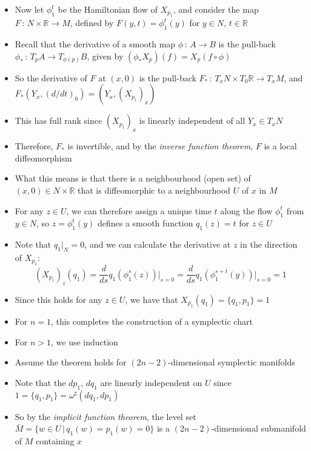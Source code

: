 \documentclass[12pt,a4paper]{article}
\numberwithin{equation}{section}
\begin{document}
\begin{itemize}
\begin{itemize}
			\item Now let $\phi_{1}^{t}$ be the Hamiltonian flow of $X_{p_{1}}$, and consider the map $F\,:\, N\times \mathbb{R}\to M$, defined by $F(y,t)=\phi_{1}^{t}(y)$ for $y\in N, \, t\in \mathbb{R}$
			\item Recall that the derivative of a smooth map $\phi\,:\, A \to B$ is the pull-back $\phi_{*}\,:\,T_{p}A\to T_{\phi(p)}B$, given by $(\phi_{*}X_{p})(f)=X_{p}(f\circ \phi)$
			\item So the derivative of $F$ at $(x,0)$ is the pull-back $F_{*}\,:\, T_{x}N\times T_{0}\mathbb{R}\to T_{x}M$, and $F_{*}(Y_{x},(d/dt)_{0})=(Y_{x},(X_{p_{1}})_{x})$
			\item This has full rank since $(X_{p_{1}})_{x}$ is linearly independent of all $Y_{x}\in T_{x}N$
			\item Therefore, $F_{*}$ is invertible, and by the \textit{inverse function theorem}, $F$ is a local diffeomorphism
			\item What this means is that there is a neighbourhood (open set) of $(x,0)\in N\times \mathbb{R}$ that is diffeomorphic to a neighbourhood $U$ of $x$ in $M$
			\item For any $z\in U$, we can therefore assign a unique time $t$ along the flow $\phi_{1}^{t}$ from $y\in N$, so $z=\phi_{1}^{t}(y)$ defines a smooth function $q_{1}(z)=t$ for $z\in U$
			\item Note that $q_{1}\rvert_{N}=0$, and we can calculate the derivative at $z$ in the direction of $X_{p_{1}}$:
			\begin{equation}
				(X_{p_{1}})_{z}(q_{1})=\frac{d}{ds}q_{1}(\phi_{1}^{s}(z))\rvert_{s=0}=\frac{d}{ds}q_{1}(\phi_{1}^{s+t}(y))\rvert_{s=0}=1
			\end{equation}
			\item Since this holds for any $z\in U$, we have that $X_{p_{1}}(q_{1})=\{q_{1},p_{1}\}=1$
			\item For $n=1$, this completes the construction of a symplectic chart
			\item For $n>1$, we use induction
			\item Assume the theorem holds for $(2n-2)$-dimensional symplectic manifolds
			\item Note that the $dp_{1}$, $dq_{1}$ are linearly independent on $U$ since $1=\{q_{1},p_{1}\}=\omega^{\sharp}(dq_{1},dp_{1})$
			\item So by the \textit{implicit function theorem}, the level set $\bar{M}=\{w\in U\,\vert\,q_{1}(w)=p_{1}(w)=0\}$ is a $(2n-2)$-dimensional submanifold of $M$ containing $x$

\end{itemize}
\end{itemize}
\end{document}
